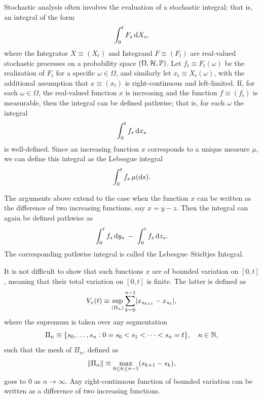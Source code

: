 Stochastic analysis often involves the evaluation of a stochastic integral; that is, an integral of the form
\begin{equation}\label{eq:StochasticIntegral}
	\int_0^t F_s \, \mathrm{d} X_s,
\end{equation}
where the Integrator \(X \equiv (X_t)\) and Integrand \(F \equiv (F_t)\) are real-valued stochastic processes on a probability space \((\Omega, \mathcal{H}, \mathbb{P})\). Let \(f_t \equiv F_t(\omega)\) be the realization of \(F_t\) for a specific \(\omega \in \Omega\), and similarly let \(x_t \equiv X_t(\omega)\), with the additional assumption that \(x \equiv (x_t)\) is right-continuous and left-limited. If, for each \(\omega \in \Omega\), the real-valued function \(x\) is increasing and the function \(f \equiv (f_t)\) is measurable, then the integral can be defined pathwise; that is, for each \(\omega\) the integral
\begin{equation}\label{eq:PathwiseIntegral}
	\int_0^t f_s \, \mathrm{d} x_s
\end{equation}
is well-defined. Since an increasing function \(x\) corresponds to a unique measure \(\mu\), we can define this integral as the Lebesgue integral
\begin{equation}\label{eq:LebesgueMeasureIntegral}
	\int_0^t f_s \, \mu(\mathrm{d} s).
\end{equation}

The arguments above extend to the case when the function \(x\) can be written as the difference of two increasing functions, say \(x = y - z\). Then the integral can again be defined pathwise as
\begin{equation}\label{eq:LebesgueStieltjesDecomposition}
	\int_0^t f_s \, \mathrm{d} y_s \;-\; \int_0^t f_s \, \mathrm{d} z_s.
\end{equation}
The corresponding pathwise integral is called the Lebesgue–Stieltjes Integral.

It is not difficult to show that such functions \(x\) are of bounded variation on \([0, t]\), meaning that their total variation on \([0, t]\) is finite. The latter is defined as
\begin{equation}\label{eq:TotalVariation}
	V_x(t) \equiv \sup_{(\Pi_n)} \sum_{k=0}^{n-1} \lvert x_{s_{k+1}} - x_{s_k}\rvert,
\end{equation}
where the supremum is taken over any segmentation
\begin{equation}\label{eq:Segmentation}
	\Pi_n \equiv \{s_0, \ldots, s_n : 0 = s_0 < s_1 < \cdots < s_n = t\}, \quad n \in \mathbb{N},
\end{equation}
such that the mesh of \(\Pi_n\), defined as
\begin{equation}\label{eq:MeshDefinition}
	\lVert\Pi_n\rVert \equiv \max_{0 \le k \le n-1} (s_{k+1} - s_k),
\end{equation}
goes to \(0\) as \(n \to \infty\). Any right-continuous function of bounded variation can be written as a difference of two increasing functions.

